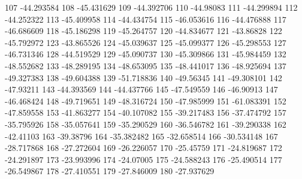 107                      -44.293584
108                      -45.431629
109                      -44.392706
110                       -44.98083
111                      -44.299894
112                      -44.252322
113                      -45.409958
114                      -44.434754
115                      -46.053616
116                      -44.476888
117                      -46.686609
118                      -45.186298
119                      -45.264757
120                      -44.834677
121                       -43.86828
122                      -45.792972
123                      -43.865526
124                      -45.039637
125                      -45.099377
126                      -45.298553
127                      -46.731346
128                      -44.519529
129                      -45.090737
130                      -45.309866
131                      -45.984459
132                      -48.552682
133                      -48.289195
134                      -48.653095
135                      -48.441017
136                      -48.925694
137                      -49.327383
138                      -49.604388
139                      -51.718836
140                       -49.56345
141                      -49.308101
142                       -47.93211
143                      -44.393569
144                      -44.437766
145                      -47.549559
146                       -46.90913
147                      -46.468424
148                      -49.719651
149                      -48.316724
150                      -47.985999
151                      -61.083391
152                      -47.859558
153                      -41.863277
154                      -40.107082
155                      -39.217483
156                      -37.474792
157                      -35.795926
158                      -35.057641
159                      -35.290529
160                      -36.546782
161                      -39.290338
162                       -42.41103
163                       -39.38796
164                      -35.382482
165                      -32.658514
166                      -30.534148
167                      -28.717868
168                      -27.272604
169                      -26.226057
170                       -25.45759
171                      -24.819687
172                      -24.291897
173                      -23.993996
174                       -24.07005
175                      -24.588243
176                      -25.490514
177                      -26.549867
178                      -27.410551
179                      -27.846009
180                      -27.937629